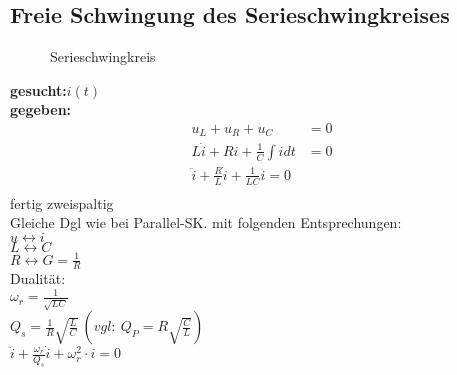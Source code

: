 \subsection{Freie Schwingung des Serieschwingkreises}
\begin{wrapfigure}{l}{0.5\textwidth}
	\centering
	
	\caption{Serieschwingkreis}
	\label{fig:SerieSKGeschlossen}
\end{wrapfigure}

\textbf{gesucht:}$i(t)$\\
\textbf{gegeben:}
\begin{align}
	u_L + u_R + u_C &= 0\\
	L\dot{i} + Ri + \frac{1}{C}\int{i}dt&=0\\%
	\boxed{\ddot{i}+\frac{R}{L}\dot{i}+\frac{1}{LC}i=0}\\
\end{align}
fertig zweispaltig\\
Gleiche Dgl wie bei Parallel-SK. mit folgenden Entsprechungen:\\
$u \leftrightarrow i$\\
$L \leftrightarrow C$\\
$R \leftrightarrow G=\frac{1}{R}$\\
Dualität:\\
$\omega_r=\frac{1}{\sqrt{LC}}$\\
$Q_s=\frac{1}{R}\sqrt{\frac{L}{C}}\ (vgl:\ Q_P=R\sqrt{\frac{C}{L}})$\\
$\boxed{\ddot i + \frac{\omega_r}{Q_s}\dot i + \omega_r^2\cdot i = 0}$\\


